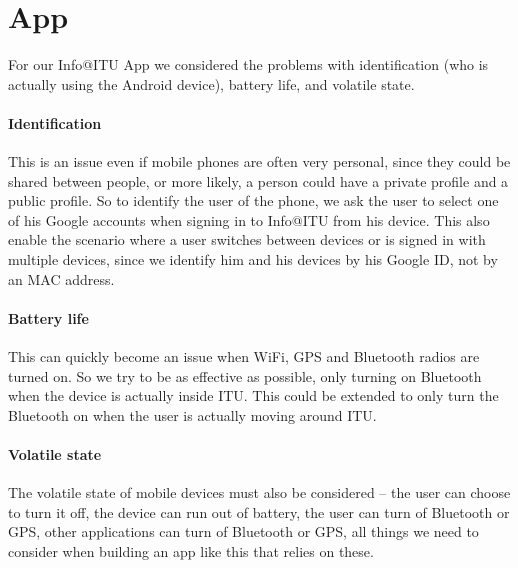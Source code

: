 \documentclass{ubicomp2011}
\begin{document}
\section{App}
For our Info@ITU App we considered the problems with identification (who is actually using the Android device), battery life, and volatile state.

\paragraph{Identification}
This is an issue even if mobile phones are often very personal, since they could be shared between people, or more likely, a person could have a private profile and a public profile. So to identify the user of the phone, we ask the user to select one of his Google accounts when signing in to Info@ITU from his device. This also enable the scenario where a user switches between devices or is signed in with multiple devices, since we identify him and his devices by his Google ID, not by an MAC address.

\paragraph{Battery life}
This can quickly become an issue when WiFi, GPS and Bluetooth radios are turned on. So we try to be as effective as possible, only turning on Bluetooth when the device is actually inside ITU. This could be extended to only turn the Bluetooth on when the user is actually moving around ITU.

\paragraph{Volatile state}
The volatile state of mobile devices must also be considered -- the user can choose to turn it off, the device can run out of battery, the user can turn of Bluetooth or GPS, other applications can turn of Bluetooth or GPS, all things we need to consider when building an app like this that relies on these.
\end{document}
